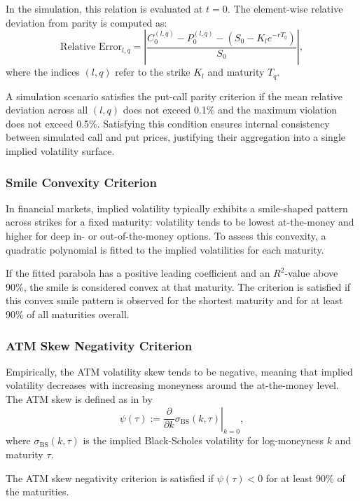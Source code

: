 In the simulation, this relation is evaluated at $t = 0$. The element-wise relative deviation from parity is computed as:
\begin{equation} \label{eq:PutCallViolation}
    \text{Relative Error}_{l,q} = \left| \frac{C_0^{(l,q)} - P_0^{(l,q)} - \left( S_0 - K_l e^{-r T_q} \right)}{S_0} \right|,
\end{equation}
where the indices $(l, q)$ refer to the strike $K_l$ and maturity $T_q$.

A simulation scenario satisfies the put-call parity criterion if the mean relative deviation across all $(l, q)$ does not exceed 0.1\% and the maximum violation does not exceed 0.5\%. Satisfying this condition ensures internal consistency between simulated call and put prices, justifying their aggregation into a single implied volatility surface.

\subsubsection*{Smile Convexity Criterion}
In financial markets, implied volatility typically exhibits a smile-shaped pattern across strikes for a fixed maturity: volatility tends to be lowest at-the-money and higher for deep in- or out-of-the-money options. To assess this convexity, a quadratic polynomial is fitted to the implied volatilities for each maturity.

If the fitted parabola has a positive leading coefficient and an $R^2$-value above 90\%, the smile is considered convex at that maturity. The criterion is satisfied if this convex smile pattern is observed for the shortest maturity and for at least 90\% of all maturities overall.


\subsubsection*{ATM Skew Negativity Criterion}
Empirically, the ATM volatility skew tends to be negative, meaning that implied volatility decreases with increasing moneyness around the at-the-money level. The ATM skew is defined as in \citet{BayerFrizGatheral2016} by
\begin{equation} \label{eq:ATMSkew}
    \psi(\tau) := \left. \frac{\partial}{\partial k} \sigma_{\text{BS}}(k, \tau) \right|_{k = 0},
\end{equation}
where $\sigma_{\text{BS}}(k, \tau)$ is the implied Black-Scholes volatility for log-moneyness $k$ and maturity $\tau$.

The ATM skew negativity criterion is satisfied if $\psi(\tau) < 0$ for at least 90\% of the maturities.


